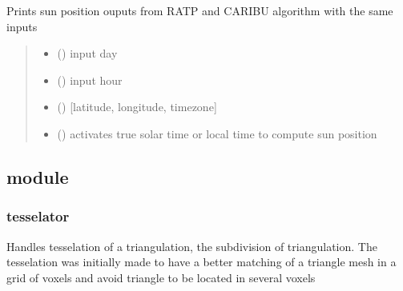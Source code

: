 \documentclass[letterpaper,10pt,english]{sphinxmanual}
\begin{document}
\begin{fulllineitems}
\label{\detokenize{reference:sun.print_sun}}
\pysigstartsignatures
{}
\pysigstopsignatures
\sphinxAtStartPar
Prints sun position ouputs from RATP and CARIBU algorithm with the same inputs
\begin{quote}\begin{description}
\begin{itemize}
\item {} 
\sphinxAtStartPar
{} () \textendash{} input day

\item {} 
\sphinxAtStartPar
{} () \textendash{} input hour

\item {} 
\sphinxAtStartPar
{} () \textendash{} {[}latitude, longitude, timezone{]}

\item {} 
\sphinxAtStartPar
{} () \textendash{} activates true solar time or local time to compute sun position

\end{itemize}

\end{description}\end{quote}

\end{fulllineitems}



\subsection{ module}
\label{\detokenize{reference:module-tesselator}}\label{\detokenize{reference:tesselator-module}}

\subsubsection{tesselator}
\label{\detokenize{reference:tesselator}}
\sphinxAtStartPar
Handles tesselation of a triangulation, the subdivision of triangulation.
The tesselation was initially made to have a better matching of a triangle mesh in a grid of voxels
and avoid triangle to be located in several voxels
\end{document}
